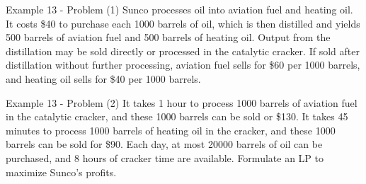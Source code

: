 \begin{frame}{Example 13 - Problem (1)}
Sunco processes oil into aviation fuel and heating oil. It costs \$40 to
purchase each 1000 barrels of oil, which is then distilled and yields 500
barrels of aviation fuel and 500 barrels of heating oil. Output from the
distillation may be sold directly or processed in the catalytic cracker. If
sold after distillation without further processing, aviation fuel sells for
\$60 per 1000 barrels, and heating oil sells for \$40 per 1000 barrels.
\end{frame}

\begin{frame}{Example 13 - Problem (2)}
It takes 1 hour to process 1000 barrels of aviation fuel in the catalytic
cracker, and these 1000 barrels can be sold or \$130. It takes 45 minutes to
process 1000 barrels of heating oil in the cracker, and these 1000 barrels can
be sold for \$90. Each day, at most 20000 barrels of oil can be purchased, and
8 hours of cracker time are available. Formulate an LP to maximize Sunco’s
profits.
\end{frame}
